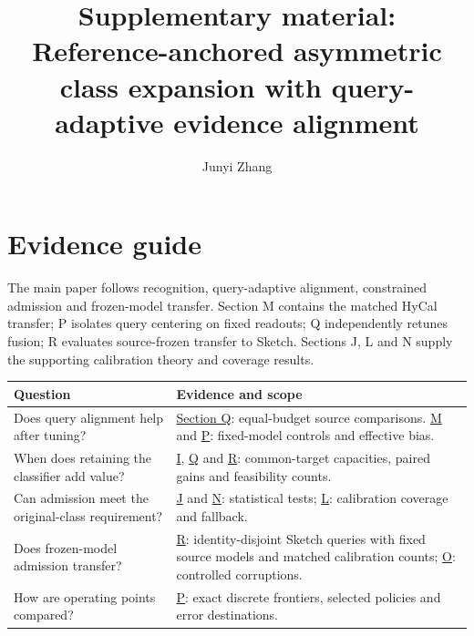 \documentclass[preprint,review,12pt]{elsarticle}
\begin{document}
\title{Supplementary material: Reference-anchored asymmetric class expansion with query-adaptive evidence alignment}
\author{Junyi Zhang}
\date{}
\maketitle
\appendix
\renewcommand{\thetable}{S\arabic{table}}
\renewcommand{\thefigure}{S\arabic{figure}}

\section*{Evidence guide}
The main paper follows recognition, query-adaptive alignment, constrained admission and frozen-model transfer. Section M contains the matched HyCal transfer; P isolates query centering on fixed readouts; Q independently retunes fusion; R evaluates source-frozen transfer to Sketch. Sections J, L and N supply the supporting calibration theory and coverage results.

\begin{center}
{\small\setlength{\tabcolsep}{5pt}\renewcommand{\arraystretch}{1.2}
\begin{tabular}{@{}p{.34\linewidth}p{.59\linewidth}@{}}
\toprule
Question & Evidence and scope \\
\midrule
Does query alignment help after tuning? & \hyperref[app:fullretuning]{Section Q}: equal-budget source comparisons. \hyperref[app:normalizationrevision]{M} and \hyperref[app:mechanismfollowup]{P}: fixed-model controls and effective bias. \\
When does retaining the classifier add value? & \hyperref[app:replication]{I}, \hyperref[app:fullretuning]{Q} and \hyperref[app:sketchvalidation]{R}: common-target capacities, paired gains and feasibility counts. \\
Can admission meet the original-class requirement? & \hyperref[app:independentrisk]{J} and \hyperref[app:pairedrevision]{N}: statistical tests; \hyperref[app:calibrationbudget]{L}: calibration coverage and fallback. \\
Does frozen-model admission transfer? & \hyperref[app:sketchvalidation]{R}: identity-disjoint Sketch queries with fixed source models and matched calibration counts; \hyperref[app:shiftrevision]{O}: controlled corruptions. \\
How are operating points compared? & \hyperref[app:mechanismfollowup]{P}: exact discrete frontiers, selected policies and error destinations. \\
\bottomrule
\end{tabular}}
\end{center}
\end{document}
